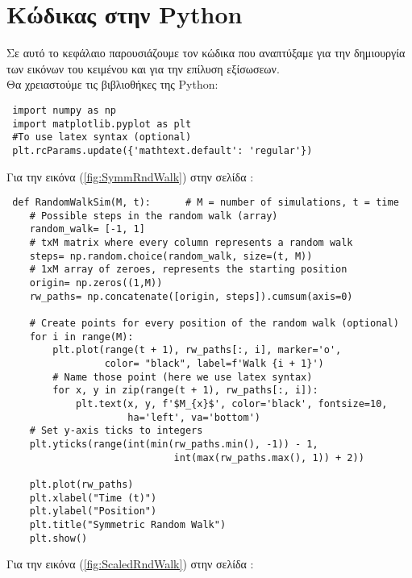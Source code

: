 \documentclass[12pt,a4paper,twoside,openany]{book}
\begin{document}
\chapter*{Κώδικας στην Python}
\raggedright
	Σε αυτό το κεφάλαιο παρουσιάζουμε τον κώδικα που αναπτύξαμε για την δημιουργία των εικόνων του κειμένου και για την επίλυση εξίσωσεων.
	\vspace{2.5mm}\\ 
	Θα χρειαστούμε τις βιβλιοθήκες της Python:
	\vspace{4mm}
\begin{lstlisting}
 import numpy as np
 import matplotlib.pyplot as plt 
 #To use latex syntax (optional)
 plt.rcParams.update({'mathtext.default': 'regular'})  \end{lstlisting}
 	\vspace{4mm}
 	Για την εικόνα (\ref{fig:SymmRndWalk}) στην σελίδα \pageref{fig:SymmRndWalk}:
 	\vspace{4mm}
\begin{lstlisting}
 def RandomWalkSim(M, t):      # M = number of simulations, t = time
 	# Possible steps in the random walk (array)
 	random_walk= [-1, 1]
 	# txM matrix where every column represents a random walk
 	steps= np.random.choice(random_walk, size=(t, M)) 
 	# 1xM array of zeroes, represents the starting position
 	origin= np.zeros((1,M)) 
 	rw_paths= np.concatenate([origin, steps]).cumsum(axis=0)
 		
 	# Create points for every position of the random walk (optional)
 	for i in range(M):
 		plt.plot(range(t + 1), rw_paths[:, i], marker='o', 
 				 color= "black", label=f'Walk {i + 1}')
 		# Name those point (here we use latex syntax) 
 		for x, y in zip(range(t + 1), rw_paths[:, i]):
 			plt.text(x, y, f'$M_{x}$', color='black', fontsize=10, 
 					 ha='left', va='bottom')
 	# Set y-axis ticks to integers
 	plt.yticks(range(int(min(rw_paths.min(), -1)) - 1, 
 						     int(max(rw_paths.max(), 1)) + 2))  
 						     				        		
 	plt.plot(rw_paths)
 	plt.xlabel("Time (t)")
 	plt.ylabel("Position")
 	plt.title("Symmetric Random Walk")
 	plt.show()\end{lstlisting}
 	\vspace{4mm}
 	Για την εικόνα (\ref{fig:ScaledRndWalk}) στην σελίδα \pageref{fig:ScaledRndWalk}:
 	\vspace{4mm}
\end{document}
